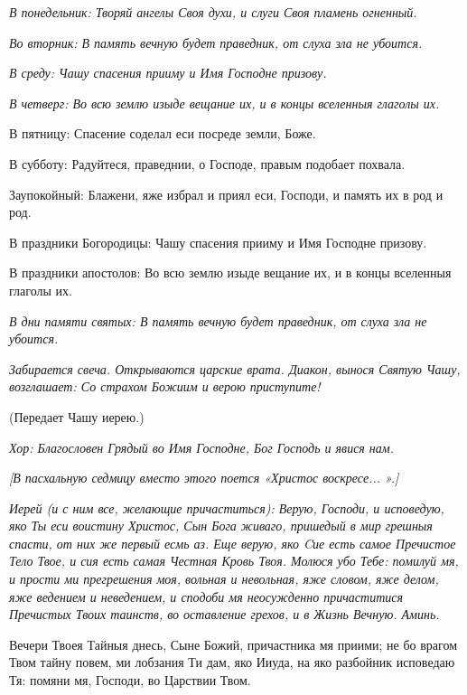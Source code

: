 \itshape В понедельник:\normalfont{} Творяй ангелы Своя духи, и слуги Своя пламень огненный. 


\itshape Во вторник:\normalfont{} В память вечную будет праведник, от слуха зла не убоится. 


\itshape В среду:\normalfont{} Чашу спасения прииму и Имя Господне призову. 


\itshape В четверг:\normalfont{} Во всю землю изыде вещание их, и в концы вселенныя глаголы их. \itshape 


  В пятницу:\normalfont{} Спасение соделал еси посреде земли, Боже. \itshape 


  В субботу:\normalfont{} Радуйтеся, праведнии, о Господе, правым подобает похвала. \itshape 


  Заупокойный:\normalfont{} Блажени, яже избрал и приял еси, Господи, и память их в род и род. \itshape 


  В праздники Богородицы:\normalfont{} Чашу спасения прииму и Имя Господне призову. \itshape 


  В праздники апостолов:\normalfont{} Во всю землю изыде вещание их, и в концы вселенныя глаголы их. 


\itshape В дни памяти святых:\normalfont{} В память вечную будет праведник, от слуха зла не убоится. 


\itshape   Забирается свеча\normalfont{}. \itshape  Открываются царские врата. Диакон, вынося Святую Чашу, возглашает: Со страхом Божиим и верою приступите! 


  (Передает Чашу иерею.) \normalfont{}


\itshape Хор:\normalfont{} Благословен Грядый во Имя Господне, Бог Господь и явися нам.


\itshape [В пасхальную седмицу вместо этого поется «Христос воскресе... ».]\normalfont{}


\itshape  Иерей (и с ним все, желающие причаститься):\normalfont{} Верую, Господи, и исповедую, яко Ты еси воистину Христос, Сын Бога живаго, пришедый в мир грешныя спасти, от них же первый есмь аз. Еще верую, яко Cие есть самое Пречистое Тело Твое, и сия есть самая Честная Кровь Твоя. Молюся убо Тебе: помилуй мя, и прости ми прегрешения моя, вольная и невольная, яже словом, яже делом, яже ведением и неведением, и сподоби мя неосужденно причаститися Пречистых Твоих таинств, во оставление грехов, и в Жизнь Вечную. Аминь.


  Вечери Твоея Тайныя днесь, Сыне Божий, причастника мя приими; не бо врагом Твом тайну повем, ми лобзания Ти дам, яко Ииуда, на яко разбойник исповедаю Тя: помяни мя, Господи, во Царствии Твом.


